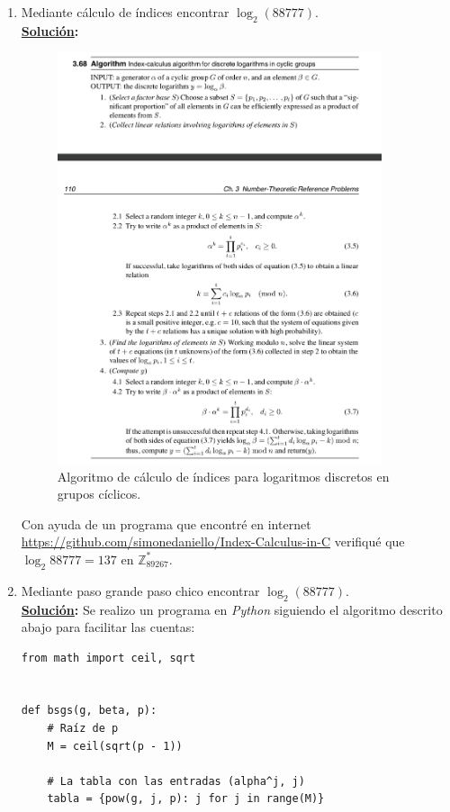 \documentclass[11pt,letterpaper]{article}
\newcommand{\Z}{\mathbb{Z}}
\newcommand{\sol}{\textbf{\underline{Solución}: }} %
\begin{document}
\begin{enumerate}[label=\alph*)]
\item Mediante cálculo de índices encontrar $\log_2 (88777)$.\\
\sol 
\begin{figure}[H]
\caption{Algoritmo de cálculo de índices para logaritmos discretos en grupos cíclicos.}
\centering
\includegraphics[width=0.9\textwidth]{assets/poi.png}
\end{figure}

Con ayuda de un programa que encontré en internet 
\url{https://github.com/simonedaniello/Index-Calculus-in-C} verifiqué que 
$\log_2 88777= 137$ en $\Z_{89267}^*$.


\item Mediante paso grande paso chico encontrar $\log_2 (88777)$.\\
\sol Se realizo un programa en \textit{Python} siguiendo el algoritmo descrito abajo para facilitar 
las cuentas:

\begin{verbatim}
from math import ceil, sqrt


def bsgs(g, beta, p):
    # Raíz de p
    M = ceil(sqrt(p - 1))

    # La tabla con las entradas (alpha^j, j)
    tabla = {pow(g, j, p): j for j in range(M)}


\end{verbatim}
\end{enumerate}
\end{document}
